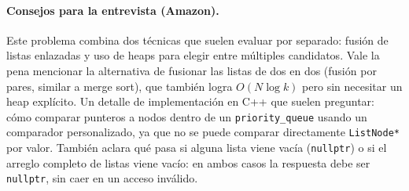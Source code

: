 \paragraph{Consejos para la entrevista (Amazon).} Este problema combina dos
técnicas que suelen evaluar por separado: fusión de listas enlazadas y uso
de heaps para elegir entre múltiples candidatos. Vale la pena mencionar la
alternativa de fusionar las listas de dos en dos (fusión por pares, similar
a merge sort), que también logra $O(N \log k)$ pero sin necesitar un heap
explícito. Un detalle de implementación en C++ que suelen preguntar: cómo
comparar punteros a nodos dentro de un \texttt{priority\_queue} usando un
comparador personalizado, ya que no se puede comparar directamente
\texttt{ListNode*} por valor. También aclara qué pasa si alguna lista viene
vacía (\texttt{nullptr}) o si el arreglo completo de listas viene vacío: en
ambos casos la respuesta debe ser \texttt{nullptr}, sin caer en un acceso
inválido.

